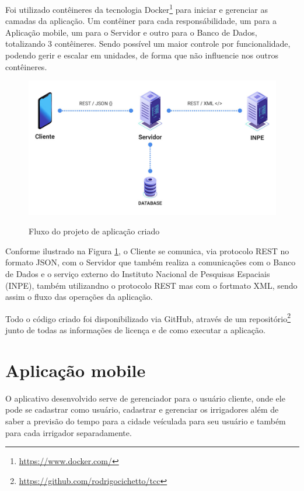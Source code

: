 \documentclass[
	12pt,				%
	openright,			%
	twoside,			%
	a4paper,			%
	english,			%
	brazil				%
	]{abntex2}
\begin{document}
Foi utilizado contêineres da tecnologia Docker\footnote{\url{https://www.docker.com/}} para iniciar e gerenciar as camadas da aplicação. Um contêiner para cada responsábilidade, um para a Aplicação mobile, um para o Servidor e outro para o Banco de Dados, totalizando 3 contêineres. Sendo possível um maior controle por funcionalidade, podendo gerir e escalar em unidades, de forma que não influencie nos outros contêineres.

\begin{figure}[h]
	\centering

	\caption{Fluxo do projeto de aplicação criado} \label{fig:ProjectFlow}
    \includegraphics[scale=0.35]{project-flow} \\

\end{figure}

Conforme ilustrado na Figura \ref{fig:ProjectFlow}, o Cliente se comunica, via protocolo REST no formato JSON, com o Servidor que também realiza a comunicações com o Banco de Dados e o serviço externo do Instituto Nacional de Pesquisas Espaciais (INPE), também utilizandno o protocolo REST mas com o fortmato XML, sendo assim o fluxo das operações da aplicação.

Todo o código criado foi disponibilizado via GitHub, através de um repositório\footnote{\url{https://github.com/rodrigocichetto/tcc}} junto de todas as informações de licença e de como executar a aplicação.

\section{Aplicação mobile}

O aplicativo desenvolvido serve de gerenciador para o usuário cliente, onde ele pode se cadastrar como usuário, cadastrar e gerenciar os irrigadores além de saber a previsão do tempo para a cidade veículada para seu usuário e também para cada irrigador separadamente.
\end{document}
